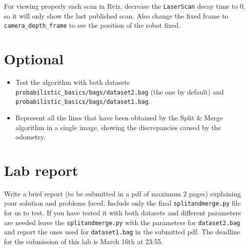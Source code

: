 \documentclass[a4paper,10pt]{article}
\begin{document}
For viewing properly each scan in Rviz, decrease the \texttt{LaserScan} decay time to 0, so it will only show the last published scan. Also change the fixed frame to \texttt{camera\_depth\_frame} to see the position of the robot fixed.

\section{Optional}
\begin{itemize}
    \item Test the algorithm with both datasets \texttt{probabilistic\_basics/bags/dataset2.bag} (the one by default) and \texttt{probabilistic\_basics/bags/dataset1.bag}.
    \item Represent all the lines that have been obtained by the Split \& Merge algorithm in a single image, showing the discrepancies caused by the odometry.
\end{itemize}

\section{Lab report}

Write a brief report (to be submitted in a pdf of maximum 2 pages) explaining your solution and problems faced. Include only the final \texttt{splitandmerge.py} file for us to test. If you have tested it with both datasets and different parameters are needed leave the \texttt{splitandmerge.py} with the parameters for \texttt{dataset2.bag} and report the ones used for \texttt{dataset1.bag} in the submitted pdf. The deadline for the submission of this lab is March 16th at 23:55.
\end{document}
